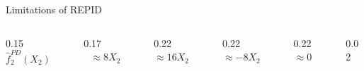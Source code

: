 \documentclass[10pt,compress,t,notes=noshow,xcolor=table]{beamer}
\newcommand{\highlightICE}[1]{\colorbox{cice}{$\displaystyle #1$}}
\newcommand{\highlight}[1]{\colorbox{orange}{$\displaystyle #1$}}
\begin{document}
\begin{framev}[align=top]{Limitations of REPID}
{{\begin{footnotesize}
\begin{columns}[T,totalwidth=\linewidth]
\begin{column}{0.15\linewidth}
\centering
$\hat{f}_2^{PD}(X_2)$ %
\end{column}
\begin{column}{0.17\linewidth}
$\text{    } \approx 8X_2$ %
\end{column}
\begin{column}{0.22\linewidth}
\centering
$\approx 16X_2$ %
\end{column}
\begin{column}{0.22\linewidth}
\centering
$ \approx -8X_2$ %
\end{column}
\begin{column}{0.22\linewidth}
\centering
$\approx 0$%
\end{column}
\begin{column}{0.02\linewidth}
\end{column}
\end{columns}
\end{footnotesize}
}
\spacer[0]
}
\end{framev}
\end{document}
